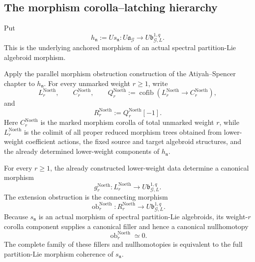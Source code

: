 \subsection{The morphism corolla--latching hierarchy}
\label{subsec:symmetry-noether-the-morphism-corolla-latching-hierarchy}

Put
\[
h_{\mathfrak n}:=Us_{\mathfrak n}:
U\mathfrak a_{\mathcal G}
\longrightarrow
U\mathfrak b_{\mathcal G,L}^{1,q}.
\]
This is the underlying anchored morphism of an actual spectral partition-Lie
algebroid morphism.

\begin{construction}
\label{constr:symmetry-noether-noether-morphism-latching-objects}
Apply the parallel morphism obstruction construction of the Atiyah--Spencer
chapter to $h_{\mathfrak n}$.  For every unmarked weight $r\ge1$, write
\[
L_r^{\mathrm{Noeth}},
\qquad
C_r^{\mathrm{Noeth}},
\qquad
Q_r^{\mathrm{Noeth}}
:=
\operatorname{cofib}
\left(
L_r^{\mathrm{Noeth}}
\longrightarrow
C_r^{\mathrm{Noeth}}
\right),
\]
and
\[
R_r^{\mathrm{Noeth}}
:=
Q_r^{\mathrm{Noeth}}[-1].
\]
Here $C_r^{\mathrm{Noeth}}$ is the marked morphism corolla of total unmarked weight
$r$, while $L_r^{\mathrm{Noeth}}$ is the colimit of all proper reduced
morphism trees obtained from lower-weight coefficient actions, the fixed source
and target algebroid structures, and the already determined lower-weight
components of $h_{\mathfrak n}$.
\end{construction}

\begin{theorem}
\label{thm:symmetry-noether-higher-differentiated-noether-coherence}
For every $r\ge1$, the already constructed lower-weight data determine a canonical
morphism
\[
g_r^{\mathrm{Noeth}}:
L_r^{\mathrm{Noeth}}
\longrightarrow
U\mathfrak b_{\mathcal G,L}^{1,q}.
\]
The extension obstruction is the connecting morphism
\[
\operatorname{ob}^{\mathrm{Noeth}}_r:
R_r^{\mathrm{Noeth}}
\longrightarrow
U\mathfrak b_{\mathcal G,L}^{1,q}.
\]
Because $s_{\mathfrak n}$ is an actual morphism of spectral partition-Lie
algebroids, its weight-$r$ corolla component supplies a canonical filler and hence
a canonical nullhomotopy
\[
\boxed{
\operatorname{ob}^{\mathrm{Noeth}}_r\simeq0.
}
\]
The complete family of these fillers and nullhomotopies is equivalent to the full
partition-Lie morphism coherence of $s_{\mathfrak n}$.
\end{theorem}

